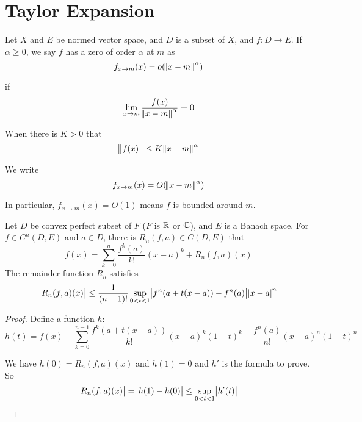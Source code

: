 \section{Taylor Expansion}

\begin{definition}
    Let $X$ and $E$ be normed vector space, and $D$ is a subset of $X$, and $f: D\rightarrow E$. If $\alpha \geq 0$, we say $f$ has a zero of order $\alpha$ at $m$ as 
    \begin{equation}
        f_{x \rightarrow m} (x) = o(\norm{x-m}^\alpha)
    \end{equation}
    
    if 
    \begin{equation}
        \lim_{x \rightarrow m} \frac{f(x)}{\norm{x - m}^\alpha} = 0
    \end{equation}
    
    When there is $K > 0$ that
    \begin{equation}
        \norm{f(x)} \leq K \norm{x - m}^\alpha
    \end{equation}
    
    We write 
    \begin{equation}
        f_{x \rightarrow m} (x) = O(\norm{x-m}^\alpha)
    \end{equation}
    
    In particular, $f_{x \rightarrow m}(x) = O(1)$ means $f$ is bounded around $m$.
\end{definition}



\begin{theorem}
    Let $D$ be convex perfect subset of $F$ ($F$ is $\mathbb{R}$ or $\mathbb{C}$), and $E$ is a Banach space. For $f \in C^n (D, E)$ and $a \in D$, there is $R_n(f,a) \in C(D,E)$ that
    \begin{equation}
        f(x) = \sum_{k=0}^n \frac{f^k (a)}{k!}(x-a)^k + R_n(f,a)(x)
    \end{equation}
    The remainder function $R_n$ satisfies
    \begin{equation}
        \abs{R_n(f,a)(x)} \leq \frac{1}{(n-1)!} \sup_{0 < t < 1}\abs{f^n (a + t(x-a)) - f^n (a)} \abs{x-a}^n
    \end{equation}
\end{theorem}
\begin{proof}
    Define a function $h$:
    \begin{equation}
        h(t) = f(x) - \sum_{k=0}^{n-1}\frac{f^k (a + t(x-a))}{k!} (x-a)^k (1-t)^k - \frac{f^n(a)}{n!}(x-a)^n (1-t)^n
    \end{equation}
    
    We have $h(0) = R_n(f,a)(x)$ and $h(1)=0$ and $h'$ is the formula to prove. So
    \begin{equation}
        \abs{R_n(f,a)(x)} = \abs{h(1) - h(0)} \leq \sup_{0 < t < 1} \abs{h'(t)}
    \end{equation}
\end{proof}


